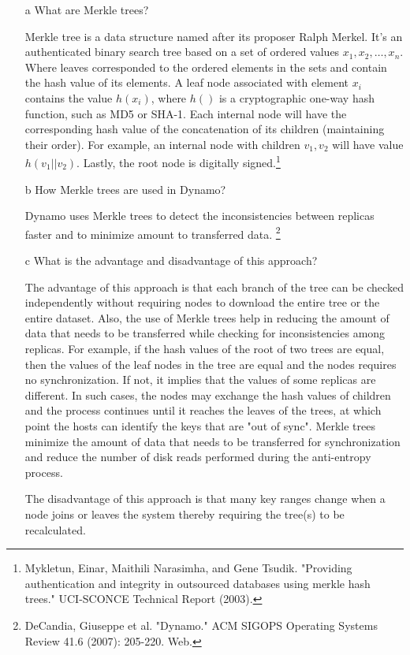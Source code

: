 \documentclass[11pt]{article}
\begin{document}
\begin{enumerate}
	\item[a] What are Merkle trees?
	
	Merkle tree is a data structure named after its proposer Ralph Merkel. It's an authenticated binary search tree based on a set of ordered values $x_1, x_2, \dots, x_n$. Where leaves corresponded to the ordered elements in the sets and contain the hash value of its elements. A leaf node associated with element $x_i$ contains the value $h(x_i)$, where $h()$ is a cryptographic one-way hash function, such as MD5 or SHA-1. Each internal node will have the corresponding hash value of the concatenation of its children (maintaining their order). For example, an internal node with children $v_1, v_2$ will have value $h(v_1 || v_2)$. Lastly, the root node is digitally signed.\footnote{Mykletun, Einar, Maithili Narasimha, and Gene Tsudik. "Providing authentication and integrity in outsourced databases using merkle hash trees." UCI-SCONCE Technical Report (2003).}
	
	\item[b] How Merkle trees are used in Dynamo?
	
	Dynamo uses Merkle trees to detect the inconsistencies between replicas faster and to minimize amount to transferred data. \footnote{DeCandia, Giuseppe et al. "Dynamo." ACM SIGOPS Operating Systems Review 41.6 (2007): 205-220. Web. }
	
	\item[c] What is the advantage and disadvantage of this approach?
	
	The advantage of this approach is that each branch of the tree can be checked independently without requiring nodes to download the entire tree or the entire dataset. Also, the use of Merkle trees help in reducing the amount of data that needs to be transferred while checking for inconsistencies among replicas. For example, if the hash values of the root of two trees are equal, then the values of the leaf nodes in the tree are equal and the nodes requires no synchronization. If not, it implies that the values of some replicas are different. In such cases, the nodes may exchange the hash values of children and the process continues until it reaches the leaves of the trees, at which point the hosts can identify the keys that are "out of sync". Merkle trees minimize the amount of data that needs to be transferred for synchronization and reduce the number of disk reads performed during the anti-entropy process. \footnotemark[\value{footnote}] 
	
	The disadvantage of this approach is that many key ranges change when a node joins or leaves the system thereby requiring the tree(s) to be recalculated.\footnotemark[\value{footnote}]
	
\end{enumerate}

\newpage
\end{document}
